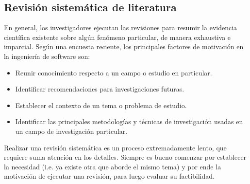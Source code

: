 \subsection{Revisión sistemática de literatura}

En general, los investigadores ejecutan las revisiones para resumir la evidencia científica existente sobre algún fenómeno particular, de manera exhaustiva e imparcial. Según una encuesta reciente, los principales factores de motivación en la ingeniería de software son:

\begin{itemize}
    \item Reunir conocimiento respecto a un campo o estudio en particular.
    \item Identificar recomendaciones para investigaciones futuras.
    \item Establecer el contexto de un tema o problema de estudio.
    \item Identificar las principales metodologías y técnicas de investigación usadas en un campo de investigación particular.
\end{itemize}

\noindent Realizar una revisión sistemática es un proceso extremadamente lento, que requiere suma atención en los detalles. Siempre es bueno comenzar por establecer la necesidad (i.e. ya existe otra que aborde el mismo tema) y por ende la motivación de ejecutar una revisión, para luego evaluar su factibilidad. 

